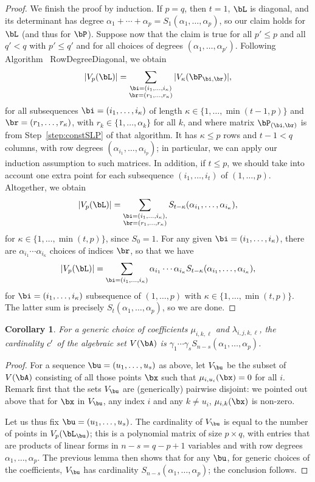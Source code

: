 \documentclass[12pt]{article}
\newtheorem{corollary}[definition]{Corollary}
\begin{document}
\begin{proof}
  We finish the proof by induction. If $p=q$, then $t=1$, $\bL$ is
  diagonal, and its determinant has degree $\alpha_1 + \cdots +
  \alpha_p = S_1(\alpha_1,\dots,\alpha_p)$, so our claim holds for
  $\bL$ (and thus for $\bP$). Suppose now that the claim is true for
  all $p'\le p$ and all $q' < q$ with $p' \le q'$ and for all choices
  of degrees $(\alpha_1,\dots,\alpha_{p'})$. Following Algorithm~{\sf
    RowDegreeDiagonal}, we obtain
  $$
  |V_p(\bL)| = \sum_{\substack{\bi=(i_1,\dots,i_\kappa)\\\br=(r_1,\dots,r_\kappa)}}  |V_\kappa(\bP_{\bi,\br})|,
  $$ for all subsequences $\bi=(i_1,\dots,i_\kappa)$ of length $\kappa
  \in \{1,\dots,\min(t-1,p)\}$ and $\br=(r_1,\dots,r_\kappa)$, with
  $r_k \in \{1,\dots,\alpha_k\}$ for all $k$, and where matrix
  $\bP_{(\bi,\br)}$ is from Step~\ref{step:constSLP} of that algorithm.
  It has $\kappa \le p$ rows and $t-1 < q$ columns, with row degrees
  $(\alpha_{i_1},\dots,\alpha_{i_p})$; in particular, we can apply our
  induction assumption to such matrices.  In addition, if $t \le p$,
  we should take into account one extra point for each subsequence
  $(i_1,\dots,i_t)$ of $(1,\dots,p)$. Altogether, we obtain
  $$
  |V_p(\bL)| = \sum_{\substack{\bi=(i_1,\dots,i_\kappa),\\\br=(r_1,\dots,r_\kappa)}}  S_{t-\kappa}(\alpha_{i_1},\dots,\alpha_{i_\kappa}),
  $$
  for $\kappa \in \{1,\dots,\min(t,p)\}$, since $S_0=1$.
  For any given $\bi=(i_1,\dots,i_\kappa)$, there are $\alpha_{i_1}\cdots \alpha_{i_\kappa}$ 
  choices of indices $\br$, so that we have
  $$
  |V_p(\bL)| = \sum_{\bi=(i_1,\dots,i_\kappa)} \alpha_{i_1}\cdots \alpha_{i_\kappa} S_{t-\kappa}(\alpha_{i_1},\dots,\alpha_{i_\kappa}),
  $$
  for $\bi=(i_1,\dots,i_\kappa)$ subsequence of $(1,\dots,p)$ with $\kappa \in \{1,\dots,\min(t,p)\}$.
  The latter sum is precisely $S_t(\alpha_1,\dots,\alpha_p)$, so we are done.
\end{proof}

\begin{corollary}\label{coro:complete}
  For a generic choice of coefficients $\mu_{i,k,\ell}$ and
  $\lambda_{i,j,k,\ell}$, the cardinality ${c'}{}$ of the algebraic set
  $V(\bA)$ is $\gamma_1 \cdots \gamma_s S_{n-s}(\alpha_1,\dots,\alpha_p)$.
\end{corollary}
\begin{proof}
  For a sequence $\bu=(u_1,\dots,u_s)$ as above, let $V_\bu$ be the
  subset of $V(\bA)$ consisting of all those points $\bx$ such that
  $\mu_{i,u_i}(\bx)=0$ for all $i$. Remark first that the sets $V_\bu$
  are (generically) pairwise disjoint: we pointed out above that for
  $\bx$ in $V_\bu$, any index $i$ and any $k \ne u_i$,
  $\mu_{i,k}(\bx)$ is non-zero.
  
  Let us thus fix $\bu=(u_1,\dots,u_s)$. The cardinality of $V_\bu$ is
  equal to the number of points in $V_p(\bL_\bu)$; this is a
  polynomial matrix of size $p \times q$, with entries that are
  products of linear forms in $n-s=q-p+1$ variables and with row
  degrees $\alpha_1,\dots,\alpha_p$. The previous lemma then shows
  that for any $\bu$, for generic choices of the coefficients, $V_\bu$
  has cardinality $S_{n-s}(\alpha_1,\dots,\alpha_p)$; the conclusion
  follows.
\end{proof}
\end{document}
